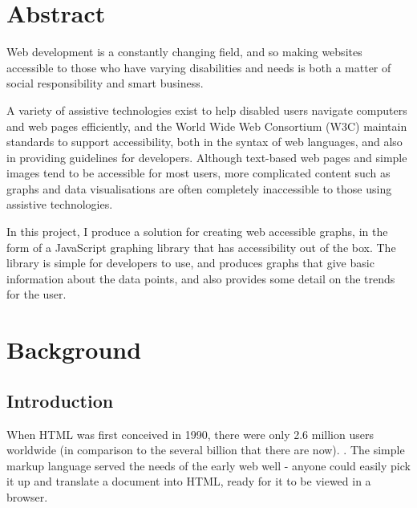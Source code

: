 \documentclass[ %
                    author={Aleena Baig},
                supervisor={Dr Simon Lock},
                    degree={BSc},
                     title={On Making Web Accessible Graphs},
                  subtitle={},
                      year={2019} ]{dissertation}
\begin{document}
\frontmatter


\makedecl

\tableofcontents


\setlength{\parskip}{1em}

\chapter{Abstract}

Web development is a constantly changing field, and so making websites accessible to those who have varying disabilities and needs is both a matter of social responsibility and smart business.

A variety of assistive technologies exist to help disabled users navigate computers and web pages efficiently, and the World Wide Web Consortium (W3C) maintain standards to support accessibility, both in the syntax of web languages, and also in providing guidelines for developers. Although text-based web pages and simple images tend to be accessible for most users, more complicated content such as graphs and data visualisations are often completely inaccessible to those using assistive technologies.

In this project, I produce a solution for creating web accessible graphs, in the form of a JavaScript graphing library that has accessibility out of the box. The library is simple for developers to use, and produces graphs that give basic information about the data points, and also provides some detail on the trends for the user.


\mainmatter

\chapter{Background}

\section{Introduction}
When HTML was first conceived in 1990, there were only 2.6 million users worldwide (in comparison to the several billion that there are now). \cite{ourworldindata:internet}. The simple markup language served the needs of the early web well - anyone could easily pick it up and translate a document into HTML, ready for it to be viewed in a browser.
\end{document}

